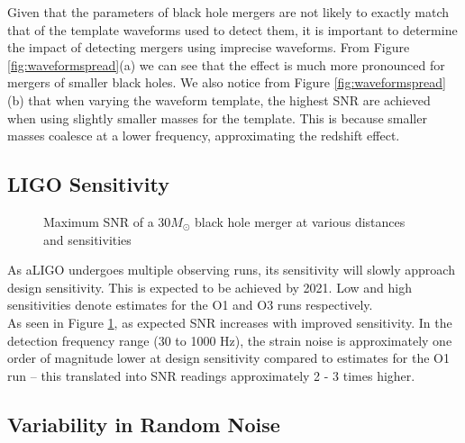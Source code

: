 \documentclass{article}
\begin{document}
Given that the parameters of black hole mergers are not likely to exactly match that of the template waveforms used to detect them, it is important to determine the impact of detecting mergers using imprecise waveforms. From Figure \ref{fig:waveformspread}(a) we can see that the effect is much more pronounced for mergers of smaller black holes. We also notice from Figure \ref{fig:waveformspread}(b) that when varying the waveform template, the highest SNR are achieved when using slightly smaller masses for the template. This is because smaller masses coalesce at a lower frequency, approximating the redshift effect. 

\subsection{LIGO Sensitivity}

\begin{figure}[!htb]
    \caption{\label{fig:sensitivity} Maximum SNR of a $30 M_\odot$ black hole merger at various distances and sensitivities}
\end{figure}

As aLIGO undergoes multiple observing runs, its sensitivity will slowly approach design sensitivity. This is expected to be achieved by 2021. Low and high sensitivities denote estimates for the O1 and O3 runs respectively. \\

As seen in Figure \ref{fig:sensitivity}, as expected SNR increases with improved sensitivity. In the detection frequency range (30 to 1000 Hz), the strain noise is approximately one order of magnitude lower at design sensitivity compared to estimates for the O1 run -- this translated into SNR readings approximately 2 - 3 times higher. 


\subsection{Variability in Random Noise}
\end{document}
